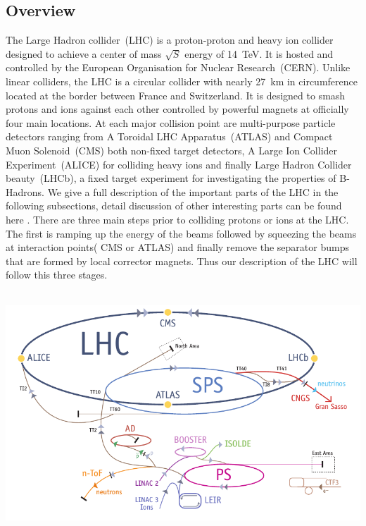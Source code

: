 \subsection{Overview}
The Large Hadron collider~(LHC) is a proton-proton and heavy ion collider designed to achieve a center of mass $\displaystyle{\sqrt{S}}$ energy of 14~TeV. It is hosted and controlled by the European Organisation for Nuclear Research~(CERN). Unlike linear colliders, the LHC is a circular collider with nearly 27~km in circumference located at the border between France and Switzerland. It is designed to smash protons and ions against each other controlled by powerful magnets at officially four main locations. At each major collision point are multi-purpose particle detectors ranging from A Toroidal LHC Apparatus~(ATLAS) and Compact Muon Solenoid~(CMS) both non-fixed target detectors, A Large Ion Collider Experiment~(ALICE) for colliding heavy ions and finally Large Hadron Collider beauty~(LHCb), a fixed target experiment for investigating the properties of B-Hadrons. We  give a full description of the important parts of the LHC in the following subsections, detail discussion of other interesting parts can be found here \cite{LHC}.
There are three main steps prior to colliding protons or ions at the LHC.  The first is ramping up the energy of the beams followed by squeezing the beams at interaction points( CMS or ATLAS) and finally remove the separator bumps that are formed by local corrector magnets.
Thus our description of the LHC will follow this three stages.
\begin{center}
\centering
\mbox{
\includegraphics[width=6in]{THESISPLOTS/The_LHC.png}}
\label{fig:LHC}
\end{center}

